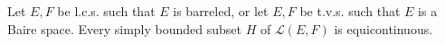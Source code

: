 Let $E, F$ be l.c.s. such that $E$ is barreled, or let $E, F$ be t.v.s. such that $E$ is a Baire space. Every simply bounded subset $H$ of $\mathcal{L}(E, F)$ is equicontinuous.
